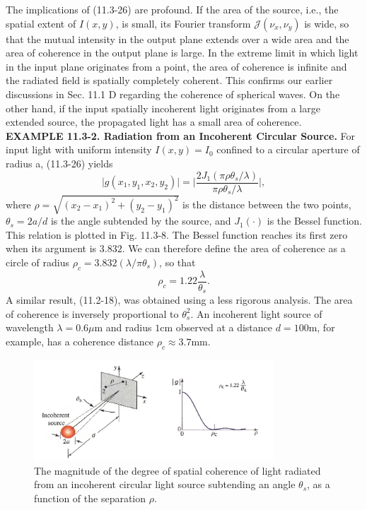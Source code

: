 \documentclass{article}
\newcommand\crule[3][black]{\textcolor{#1}{\rule{#2}{#3}}}
\numberwithin{figure}{subsection}
\numberwithin{table}{subsection}
\begin{document}
\par The implications of (11.3-26) are profound. If the area of the source, i.e., the spatial extent of $I(x,y)$, is small, its Fourier transform $\mathcal{J}(\nu_x, \nu_y)$ is wide, so that the mutual intensity in the output plane extends over a wide area and the area of coherence in the output plane is large. In the extreme limit in which light in the input plane originates from a point, the area of coherence is infinite and the radiated field is spatially completely coherent. This confirms our earlier discussions in Sec. 11.1 D regarding the coherence of spherical waves. On the other hand, if the input spatially incoherent light originates from a large extended source, the propagated light has a small area of coherence.\\
\noindent{\crule[ksc]{\textwidth}{0.1cm}}
\textbf{EXAMPLE 11.3-2. Radiation from an Incoherent Circular Source.} For input light with uniform intensity $I(x,y) = I_0$ confined to a circular aperture of radius a, (11.3-26) yields
\begin{equation}
\lvert g(x_1, y_1, x_2, y_2) \rvert = \bigg\lvert \frac{2J_1(\pi\rho\theta_s / \lambda)}{\pi\rho\theta_s / \lambda} \bigg\rvert ,
\end{equation}
where $\rho = \sqrt{(x_2 - x_1)^2 + (y_2 - y_1)^2}$ is the distance between the two points, $\theta_s = 2a / d$ is the angle subtended by the source, and $J_1 (\cdot)$ is the Bessel function. This relation is plotted in Fig. 11.3-8. The Bessel function reaches its first zero when its argument is $3.832$. We can therefore define the area of coherence as a circle of radius $\rho_c = 3.832(\lambda / \pi\theta_s)$, so that
\begin{equation}
\rho_c = 1.22 \frac{\lambda}{\theta_s} .
\end{equation}
A similar result, (11.2-18), was obtained using a less rigorous analysis. The area of coherence is inversely proportional to $\theta_s^2$. An incoherent light source of wavelength $\lambda = 0.6 \mu$m and radius $1$cm
observed at a distance $d = 100$m, for example, has a coherence distance $\rho_c \approx 3.7$mm.
\begin{figure}[H]
\centering
\includegraphics[width=0.8\textwidth]{11_3_8.PNG}
\caption{The magnitude of the degree of spatial coherence of light radiated from an incoherent circular light source subtending an angle $\theta_s$, as a function of the separation $\rho$.}
\label{fig: 11_3_8}
\end{figure}
\end{document}
